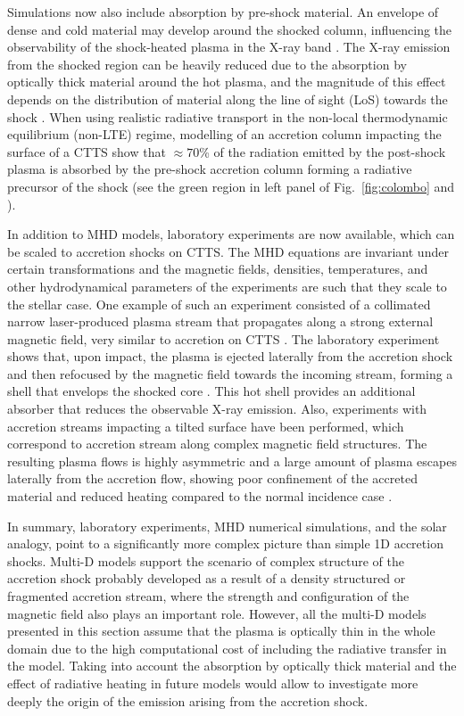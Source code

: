 Simulations now also include absorption by pre-shock material. An envelope of dense and cold material may develop around the shocked column, influencing the observability of the shock-heated plasma in the X-ray band \citep{Orlando_2013}. The X-ray emission from the shocked region can be heavily reduced due to the absorption by  optically thick material around the hot plasma, and the magnitude of this effect depends on the distribution of material along the line of sight (LoS) towards the shock \cite{Bonito_2014}. 
When using realistic radiative transport in the non-local thermodynamic equilibrium (non-LTE) regime, modelling of an accretion column impacting the surface of a CTTS show that $\approx 70$\% of the radiation emitted by the post-shock plasma is absorbed by the pre-shock accretion column forming a radiative precursor of the shock (see the green region in left panel of Fig.~\ref{fig:colombo} and \cite{Colombo_2019b}).                  

In addition to MHD models, laboratory experiments are now available, which can be scaled to accretion shocks on CTTS. The MHD equations are invariant under certain transformations and the magnetic fields, densities, temperatures, and other hydrodynamical parameters of the experiments are such that they scale to the stellar case. 
One example of such an experiment consisted of a collimated narrow laser-produced plasma stream that propagates along a strong external magnetic field, very similar to accretion on CTTS \cite{Revet_2017}. The laboratory experiment shows
that, upon impact, the plasma is ejected laterally from the accretion shock and then refocused by the magnetic field towards the incoming stream, forming a shell that envelops the shocked core \cite{Revet_2017}. This hot shell provides an additional absorber that reduces the observable  X-ray emission. Also,  experiments with accretion streams impacting a tilted surface have been performed, which correspond to accretion stream along complex magnetic field structures. The resulting plasma flows is highly asymmetric and a large amount of plasma escapes laterally from the accretion flow, showing poor confinement of the accreted material and reduced heating compared to the normal
incidence case \cite{Burdonov_2020}.

In summary, laboratory experiments, MHD numerical simulations, and the solar analogy, point to a significantly more complex picture than  simple 1D accretion shocks.
Multi-D models support the scenario of complex structure of the accretion shock probably developed as a result of a density structured or fragmented accretion stream, where the strength and configuration of the magnetic field also plays an important role. However, all the multi-D models presented in this section assume that the plasma is optically thin in the whole domain due to the high computational cost of including the radiative transfer in the model. Taking into account the absorption by optically thick material and the effect of radiative heating in future models would allow to investigate more deeply the origin of the emission arising from the accretion shock.

